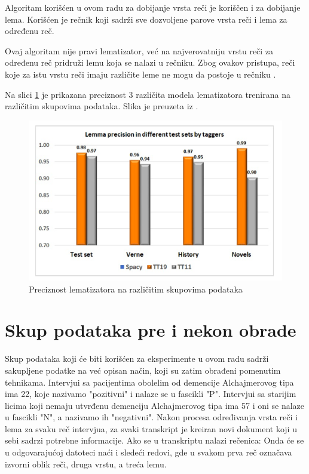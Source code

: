 \documentclass[12pt,oneside]{memoir}
\begin{document}
Algoritam korišćen u ovom radu za dobijanje vrsta reči je koriščen i za dobijanje lema. Korišćen je rečnik koji sadrži sve dozvoljene parove vrsta reči i lema za određenu reč.

Ovaj algoritam nije pravi lematizator, već na najverovatniju vrstu reči za određenu reč pridruži lemu koja se nalazi u rečniku. Zbog ovakov pristupa, reči koje za istu vrstu reči imaju različite leme ne mogu da postoje u rečniku \cite{tagger}.

Na slici \ref{img:lemmatization} je prikazana preciznost 3 različita modela lematizatora trenirana na različitim skupovima podataka. Slika je preuzeta iz \cite{tagger}.

\begin{figure}[h!]
\centering
\includegraphics[width=.7\textwidth]{images/lemmatization.png}
\caption{Preciznost lematizatora na različitim skupovima podataka}
\label{img:lemmatization}
\end{figure}

\section{Skup podataka pre i nekon obrade}

Skup podataka koji će biti korišćen za eksperimente u ovom radu sadrži sakupljene podatke na već opisan način, koji su zatim obrađeni pomenutim tehnikama. Intervjui sa pacijentima obolelim od demencije Alchajmerovog tipa ima 22, koje nazivamo "pozitivni" i nalaze se u fascikli "P". Intervjui sa starijim licima koji nemaju utvrđenu demenciju Alchajmerovog tipa ima 57 i oni se nalaze u fascikli "N", a nazivamo ih "negativni". Nakon procesa određivanja vrsta reči i lema za svaku reč intervjua, za svaki transkript je kreiran novi dokument koji u sebi sadrzi potrebne informacije. Ako se u transkriptu nalazi rečenica:
\newline
\newline
\noindent{}
\newline
\newline
Onda će se u odgovarajućoj datoteci naći i sledeći redovi, gde u svakom prva reč označava izvorni oblik reči, druga vrstu, a treća lemu.
\newline
\newline
\noindent{}
\newline
\newline
\end{document}

